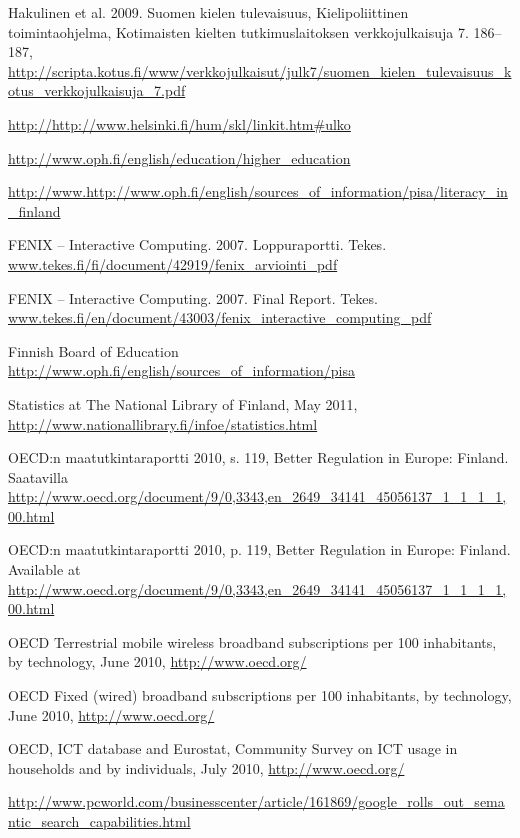 \documentclass[]{../../metanetpaper}
\begin{document}
\begin{thebibliography}{102}
Hakulinen et al. 2009. Suomen kielen tulevaisuus, Kielipoliittinen
toimintaohjelma, Kotimaisten kielten tutkimuslaitoksen verkkojulkaisuja 7.
186–187,
\url{http://scripta.kotus.fi/www/verkkojulkaisut/julk7/suomen_kielen_tulevaisuus_kotus_verkkojulkaisuja_7.pdf}

\url{http://http://www.helsinki.fi/hum/skl/linkit.htm#ulko}

\url{http://www.oph.fi/english/education/higher_education}

\url{http://www.http://www.oph.fi/english/sources_of_information/pisa/literacy_in_finland}

FENIX -- Interactive Computing. 2007. Loppuraportti. Tekes.
\url{www.tekes.fi/fi/document/42919/fenix_arviointi_pdf}

FENIX -- Interactive Computing. 2007. Final Report. Tekes.
\url{www.tekes.fi/en/document/43003/fenix_interactive_computing_pdf}

Finnish Board of Education
\url{http://www.oph.fi/english/sources_of_information/pisa}

Statistics at The National Library of Finland, May 2011,
\url{http://www.nationallibrary.fi/infoe/statistics.html}

OECD:n maatutkintaraportti 2010, s. 119, Better Regulation in Europe:
Finland. Saatavilla
\url{http://www.oecd.org/document/9/0,3343,en_2649_34141_45056137_1_1_1_1,00.html}

OECD:n maatutkintaraportti 2010, p. 119, Better Regulation in Europe:
Finland. Available at
\url{http://www.oecd.org/document/9/0,3343,en_2649_34141_45056137_1_1_1_1,00.html}

OECD Terrestrial mobile wireless broadband subscriptions per 100 inhabitants,
by technology, June 2010, \url{http://www.oecd.org/}

OECD Fixed (wired) broadband subscriptions per 100 inhabitants, by
technology, June 2010, \url{http://www.oecd.org/}

OECD, ICT database and Eurostat, Community Survey on ICT usage in households
and by individuals, July 2010, \url{http://www.oecd.org/}

\url{http://www.pcworld.com/businesscenter/article/161869/google_rolls_out_semantic_search_capabilities.html}


\end{thebibliography}
\end{document}

